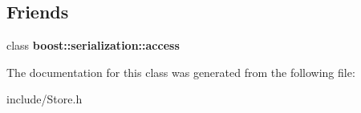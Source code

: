 \subsection*{Friends}
\begin{DoxyCompactItemize}
\item 
\hypertarget{classStore_ac98d07dd8f7b70e16ccb9a01abf56b9c}{class {\bfseries boost\-::serialization\-::access}}\label{classStore_ac98d07dd8f7b70e16ccb9a01abf56b9c}

\end{DoxyCompactItemize}


The documentation for this class was generated from the following file\-:\begin{DoxyCompactItemize}
\item 
include/Store.\-h\end{DoxyCompactItemize}
